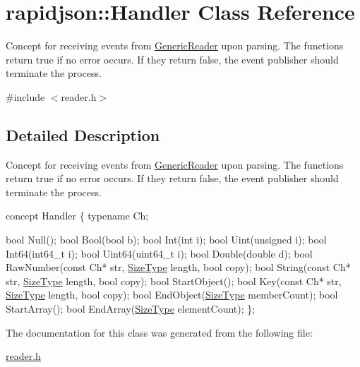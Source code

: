 \hypertarget{a00138}{}\section{rapidjson\+:\+:Handler Class Reference}
\label{a00138}


Concept for receiving events from \hyperlink{a00122}{Generic\+Reader} upon parsing. The functions return true if no error occurs. If they return false, the event publisher should terminate the process.  




{\ttfamily \#include $<$reader.\+h$>$}



\subsection{Detailed Description}
Concept for receiving events from \hyperlink{a00122}{Generic\+Reader} upon parsing. The functions return true if no error occurs. If they return false, the event publisher should terminate the process. 


\begin{DoxyCode}
concept Handler \{
    \textcolor{keyword}{typename} Ch;

    \textcolor{keywordtype}{bool} Null();
    \textcolor{keywordtype}{bool} Bool(\textcolor{keywordtype}{bool} b);
    \textcolor{keywordtype}{bool} Int(\textcolor{keywordtype}{int} i);
    \textcolor{keywordtype}{bool} Uint(\textcolor{keywordtype}{unsigned} i);
    \textcolor{keywordtype}{bool} Int64(int64\_t i);
    \textcolor{keywordtype}{bool} Uint64(uint64\_t i);
    \textcolor{keywordtype}{bool} Double(\textcolor{keywordtype}{double} d);
    \textcolor{keywordtype}{bool} RawNumber(\textcolor{keyword}{const} Ch* str, \hyperlink{a00677_a5ed6e6e67250fadbd041127e6386dcb5}{SizeType} length, \textcolor{keywordtype}{bool} copy);
    \textcolor{keywordtype}{bool} String(\textcolor{keyword}{const} Ch* str, \hyperlink{a00677_a5ed6e6e67250fadbd041127e6386dcb5}{SizeType} length, \textcolor{keywordtype}{bool} copy);
    \textcolor{keywordtype}{bool} StartObject();
    \textcolor{keywordtype}{bool} Key(\textcolor{keyword}{const} Ch* str, \hyperlink{a00677_a5ed6e6e67250fadbd041127e6386dcb5}{SizeType} length, \textcolor{keywordtype}{bool} copy);
    \textcolor{keywordtype}{bool} EndObject(\hyperlink{a00677_a5ed6e6e67250fadbd041127e6386dcb5}{SizeType} memberCount);
    \textcolor{keywordtype}{bool} StartArray();
    \textcolor{keywordtype}{bool} EndArray(\hyperlink{a00677_a5ed6e6e67250fadbd041127e6386dcb5}{SizeType} elementCount);
\};
\end{DoxyCode}
 

The documentation for this class was generated from the following file\+:\begin{DoxyCompactItemize}
\item 
\hyperlink{a00683}{reader.\+h}\end{DoxyCompactItemize}
